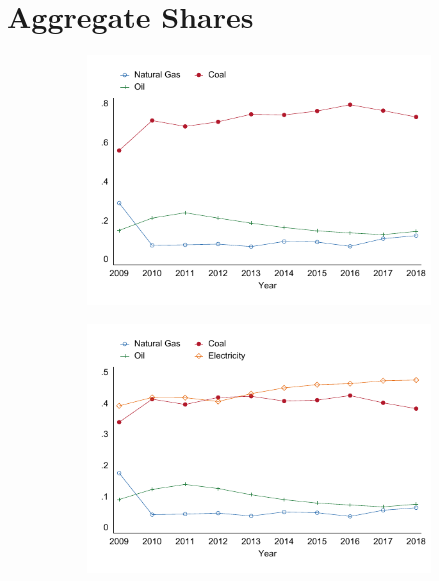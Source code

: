 \documentclass[12pt,notitlepage]{article}
\begin{document}
\section{Aggregate Shares}

\begin{figure}[!htpb]
\centering
\caption{Spending Shares}
\begin{subfigure}{.49\textwidth}
    \centering
 \includegraphics[scale=0.8]{../Output/Graphs/FuelSpendingShare_year.pdf}
\end{subfigure}%
\begin{subfigure}{.49\textwidth}
    \centering
 \includegraphics[scale=0.8]{../Output/Graphs/EnergySpendingShare_year.pdf}
\end{subfigure}
\end{figure}
\end{document}
